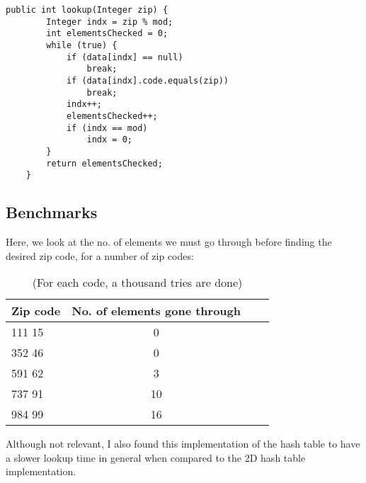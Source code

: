 \documentclass[a4paper,11pt]{article}
\begin{document}
 \begin{verbatim}
public int lookup(Integer zip) {
        Integer indx = zip % mod;
        int elementsChecked = 0;
        while (true) {
            if (data[indx] == null)
                break;
            if (data[indx].code.equals(zip))
                break;
            indx++;
            elementsChecked++;
            if (indx == mod)
                indx = 0;
        }
        return elementsChecked;
    }
\end{verbatim}


\subsection*{Benchmarks}
Here, we look at the no. of elements we must go through before finding the desired zip code, for a number of zip codes:

\begin{table}[h]
\begin{center}
\begin{tabular}{l|c|c|c}
\textbf{Zip code} & \textbf{No. of elements gone through}\\
\hline
  111 15     &  0\\
  352 46      &  0\\
  591 62      &    3\\
  737 91      &  10\\
  984 99      &  16\\
\end{tabular}
\caption{(For each code, a thousand tries are done)}
\label{tab:table1}
\end{center}
\end{table}

Although not relevant, I also found this implementation of the hash table to have a slower lookup time in general when compared to the 2D hash table implementation.
\end{document}

